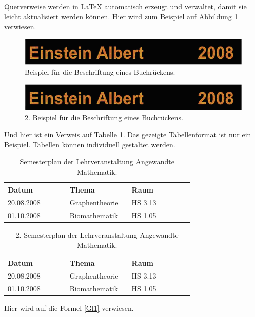 \documentclass[Master,BMR,english]{BASE/twbook}
\begin{document}
\noindent Querverweise werden in \LaTeX{} automatisch erzeugt und verwaltet, damit sie leicht aktualisiert werden können. Hier wird zum Beispiel auf Abbildung \ref{Abb1} verwiesen.

\begin{figure}[!htbp]
\centering
\includegraphics[width=0.5\linewidth]{PICs/buchruecken}
\caption{Beispiel für die Beschriftung eines Buchrückens.}\label{Abb1}
\end{figure}
\begin{figure}[!htbp]
\centering
\includegraphics[width=0.5\linewidth]{PICs/buchruecken}
\caption{2. Beispiel für die Beschriftung eines Buchrückens.}\label{Abb2}
\end{figure}

Und hier ist ein Verweis auf Tabelle \ref{tab1}. Das gezeigte Tabellenformat ist nur ein Beispiel. Tabellen können individuell gestaltet werden.

\begin{table}[!htbp]
\centering
\caption{Semesterplan der Lehrveranstaltung \glqq Angewandte Mathematik\grqq.}\label{tab1}
\begin{tabular}{| p{0.3\linewidth} | p{0.3\linewidth} | p{0.3\linewidth} |}\hline
Datum & Thema & Raum\\\hline
20.08.2008 & Graphentheorie & HS 3.13\\
01.10.2008 & Biomathematik & HS 1.05\\\hline
\end{tabular}
\end{table}
\begin{table}[!htbp]
\centering
\caption{2. Semesterplan der Lehrveranstaltung \glqq Angewandte Mathematik\grqq.}\label{tab2}
\begin{tabular}{| p{0.3\linewidth} | p{0.3\linewidth} | p{0.3\linewidth} |}\hline
Datum & Thema & Raum\\\hline
20.08.2008 & Graphentheorie & HS 3.13\\
01.10.2008 & Biomathematik & HS 1.05\\\hline
\end{tabular}
\end{table}

Hier wird auf die Formel \ref{Gl1} verwiesen.
\end{document}
